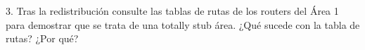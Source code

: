 \begin{ejer}
3. Tras la redistribución consulte las tablas de rutas de los routers del Área 1 para demostrar que se trata de una totally stub área. ¿Qué sucede con la tabla de rutas? ¿Por qué?
\end{ejer}